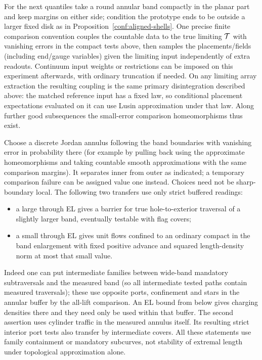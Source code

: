 For the next quantiles take a round annular band compactly in the planar part and keep margins on
either side; condition the prototype ends to be outside a larger fixed disk as in
Proposition~\ref{conf:aligned-shells}. One precise finite comparison convention couples the
countable data to the true limiting \({\cal T}\) with vanishing errors in the compact tests above,
then samples the placements/fields (including end/gauge variables) given the limiting input
independently of extra readouts. Continuum input weights or restrictions can be imposed on this
experiment afterwards, with ordinary truncation if needed. On any limiting array extraction the
resulting coupling is the same primary disintegration described above: the matched reference input
has a fixed law, so conditional placement expectations evaluated on it can use Lusin approximation
under that law. Along further good subsequences the small-error comparison homeomorphisms thus
exist.

Choose a discrete Jordan annulus following the band boundaries with vanishing error in probability
there (for example by pulling back using the approximate homeomorphisms and taking countable smooth
approximations with the same comparison margins). It separates inner from outer as indicated; a
temporary comparison failure can be assigned value one instead. Choices need not be sharp-boundary
local. The following two transfers use only strict buffered readings:

\begin{itemize}

\item a large through EL gives a barrier for true hole-to-exterior traversal of a slightly larger
band, eventually testable with flag covers;

\item a small through EL gives unit flows confined to an ordinary compact in the band enlargement
with fixed positive advance and squared length-density norm at most that small value.

\end{itemize}

Indeed one can put intermediate families between wide-band mandatory subtraversals and the measured
band (so all intermediate tested paths contain measured traversals); these use opposite ports,
confinement and stars in the annular buffer by the all-lift comparison. An EL bound from below gives
charging densities there and they need only be used within that buffer. The second assertion uses
cylinder traffic in the measured annulus itself. Its resulting strict interior port tests also
transfer by intermediate covers. All these statements use family containment or mandatory subcurves,
not stability of extremal length under topological approximation alone.


